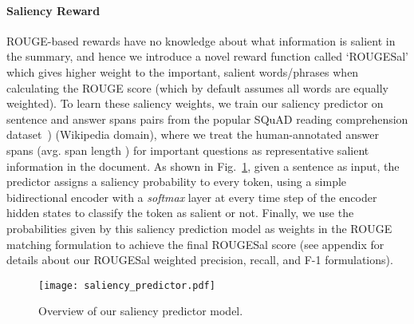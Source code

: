 \documentclass[11pt,a4paper]{article}
\begin{document}
\paragraph{Saliency Reward}
\label{subsec:saliency-rewards}
ROUGE-based rewards have no knowledge about what information is salient in the summary, and hence we introduce a novel reward function called `ROUGESal' which gives higher weight to the important, salient words/phrases when calculating the ROUGE score (which by default assumes all words are equally weighted). To learn these saliency weights, we train our saliency predictor on sentence and answer spans pairs from the popular SQuAD reading comprehension dataset~\cite{rajpurkar2016squad}) (Wikipedia domain), where we treat the human-annotated answer spans (avg. span length ) for important questions as representative salient information in the document. As shown in Fig.~\ref{fig:saliency-predictor}, given a sentence as input, the predictor assigns a saliency probability to every token, using a simple bidirectional encoder with a \emph{softmax} layer at every time step of the encoder hidden states to classify the token as salient or not. Finally, we use the probabilities given by this saliency prediction model as weights in the ROUGE matching formulation to achieve the final ROUGESal score (see appendix for details about our ROUGESal weighted precision, recall, and F-1 formulations).


\begin{figure}
\centering
\texttt{[image: saliency\_predictor.pdf]}
\vspace{-10pt}
\caption{Overview of our saliency predictor model.}
\vspace{-15pt}
\label{fig:saliency-predictor}
\end{figure}
\end{document}
